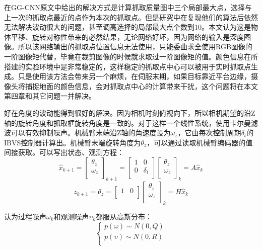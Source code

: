 \documentclass[fontset=fandol,type=bachelor,campus=harbin]{hithesisbook}
\begin{document}
在GG-CNN原文中给出的解决方式是计算抓取质量图中三个局部最大点，选择与上一次的抓取点最近的点作为本次的抓取点。但是研究中在复现他们的算法后依然无法解决波动很大的问题，甚至调高选择的局部最大点个数到10。本文认为这是物体平移、旋转对称性带来的必然结果，无论网络好坏，因为网络的输入是深度图像。所以该网络输出的抓取点位置信息无法使用，只能委曲求全使用RGB图像的一阶图像矩代替，毕竟在裁剪图像的时候就求取过一阶图像矩的值。颜色信息在所搭建的实验环境中是非常稳定的，这样稳定的抓取点中心可以被用于实时抓取点生成。只是使用该方法会带来另一个麻烦，在伺服末期，如果目标靠近平台边缘，摄像头将捕捉地面的颜色信息，会对抓取点中心的计算带来干扰，这个问题将在本文第四章和其它问题一并解决。


好在角度的波动能得到很好的解决。因为相机时刻俯视向下，所以相机期望的沿Z轴的旋转角度和抓取框旋转角度是一致的。对于这样一个线性系统，使用卡尔曼滤波可以有效抑制噪声。机械臂末端沿Z轴的角速度设为$\omega_z$，它由每次控制周期$\delta _t$的IBVS控制器计算出。机械臂末端旋转角度为$\theta_z$，可以通过读取机械臂编码器的值间接获取。可以写出状态、观测方程：
\begin{equation}
\hat{x}_{k+1}=\left[ \begin{array}{c}
	\theta _z\\
	\omega _z\\
\end{array} \right] _{k+1}=\left[ \begin{matrix}
	1&		0\\
	0&		\delta _t\\
\end{matrix} \right] \left[ \begin{array}{c}
	\theta _z\\
	\omega _z\\
\end{array} \right] _k=A\hat{x}_k
\label{状态方程}
\end{equation}
\begin{equation}
z_{k+1}=\theta _z=\left[ \begin{matrix}
	1&		0\\
\end{matrix} \right] \left[ \begin{array}{c}
	\theta _z\\
	\omega _z\\
\end{array} \right] _k=H\hat{x}_k
\label{观测方程}
\end{equation}


认为过程噪声$\omega_k$和观测噪声$\upsilon_k$都服从高斯分布：
\begin{equation}
\left\{ \begin{array}{c}
	p\left( \omega \right) \sim N\left( 0,Q \right)\\
	p\left( \upsilon \right) \sim N\left( 0,R \right)\\
\end{array} \right. 
\label{噪声分布}
\end{equation}
\end{document}
